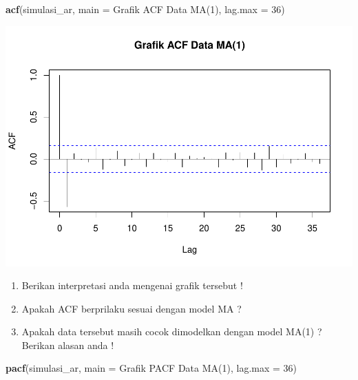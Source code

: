 \documentclass[
]{book}
\newenvironment{Shaded}{\begin{snugshade}}{\end{snugshade}}
\newcommand{\AttributeTok}[1]{\textcolor[rgb]{0.13,0.29,0.53}{#1}}
\newcommand{\DecValTok}[1]{\textcolor[rgb]{0.00,0.00,0.81}{#1}}
\newcommand{\FunctionTok}[1]{\textcolor[rgb]{0.13,0.29,0.53}{\textbf{#1}}}
\newcommand{\NormalTok}[1]{#1}
\newcommand{\StringTok}[1]{\textcolor[rgb]{0.31,0.60,0.02}{#1}}
\begin{document}
\begin{Shaded}
\begin{Highlighting}[]
\FunctionTok{acf}\NormalTok{(simulasi\_ar, }\AttributeTok{main =} \StringTok{\textquotesingle{}Grafik ACF Data MA(1)\textquotesingle{}}\NormalTok{, }
  \AttributeTok{lag.max =} \DecValTok{36}\NormalTok{)}
\end{Highlighting}
\end{Shaded}

\begin{center}\includegraphics{_main_files/figure-latex/acf MA-1} \end{center}
\begin{jp}{}{}
\begin{enumerate}
\item Berikan interpretasi anda mengenai grafik tersebut !  
\item Apakah ACF berprilaku sesuai dengan model MA ? 
\item Apakah data tersebut masih cocok dimodelkan dengan model MA(1) ? Berikan alasan anda !
\end{enumerate}
\end{jp}

\begin{Shaded}
\begin{Highlighting}[]
\FunctionTok{pacf}\NormalTok{(simulasi\_ar, }\AttributeTok{main =} \StringTok{\textquotesingle{}Grafik PACF Data MA(1)\textquotesingle{}}\NormalTok{, }
  \AttributeTok{lag.max =} \DecValTok{36}\NormalTok{)}
\end{Highlighting}
\end{Shaded}
\end{document}
